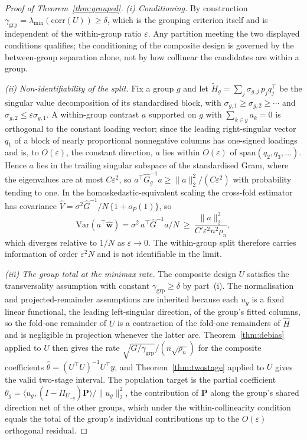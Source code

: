\documentclass[12pt]{article}
\newcommand{\1}{\mathbf{1}}
\newcommand{\Pmat}{\mathbf{P}}
\newcommand{\bw}{\mathbf{w}}
\begin{document}
\begin{proof}[Proof of Theorem~\ref{thm:grouped}]
\emph{(i) Conditioning.} By construction $\gamma_{\mathrm{grp}}=\lambda_{\min}(\mathrm{corr}(U))\ge\delta$,
which is the grouping criterion itself and is independent of the within-group ratio $\varepsilon$. Any
partition meeting the two displayed conditions qualifies; the conditioning of the composite design is governed
by the between-group separation alone, not by how collinear the candidates are within a group.

\emph{(ii) Non-identifiability of the split.} Fix a group $g$ and let $\widetilde H_g=\sum_j\sigma_{g,j}\,
p_j q_j^\top$ be the singular value decomposition of its standardised block, with $\sigma_{g,1}\ge\sigma_{g,2}
\ge\cdots$ and $\sigma_{g,2}\le\varepsilon\sigma_{g,1}$. A within-group contrast $a$ supported on $g$ with
$\sum_{k\in g}a_k=0$ is orthogonal to the constant loading vector; since the leading right-singular vector
$q_1$ of a block of nearly proportional nonnegative columns has one-signed loadings and is, to $O(\varepsilon)$,
the constant direction, $a$ lies within $O(\varepsilon)$ of $\mathrm{span}(q_2,q_3,\dots)$. Hence $a$ lies in
the trailing singular subspace of the standardised Gram, where the eigenvalues are at most $C\varepsilon^2$, so
$a^\top\widehat G_g^{-1}a\ge\|a\|_2^2/(C\varepsilon^2)$ with probability tending to one. In the
homoskedastic-equivalent scaling the cross-fold estimator has covariance $\widehat V=\sigma^2\widehat
G^{-1}/N\,\{1+o_P(1)\}$, so
\[
    \mathrm{Var}(a^\top\widehat{\bw})=\sigma^2\,a^\top\widehat G^{-1}a/N
    \ \ge\ \frac{\|a\|_2^2}{C'\varepsilon^2 n^2\rho_n},
\]
which diverges relative to $1/N$ as $\varepsilon\to0$. The within-group split therefore carries information of
order $\varepsilon^2 N$ and is not identifiable in the limit.

\emph{(iii) The group total at the minimax rate.} The composite design $U$ satisfies the transversality
assumption with constant $\gamma_{\mathrm{grp}}\ge\delta$ by part~(i). The normalisation and projected-remainder
assumptions are inherited because each $u_g$ is a fixed linear functional, the leading left-singular direction,
of the group's fitted columns, so the fold-one remainder of $U$ is a contraction of the fold-one remainders of
$\widehat H$ and is negligible in projection whenever the latter are. Theorem~\ref{thm:debias} applied to $U$
then gives the rate $\sqrt{G/\gamma_{\mathrm{grp}}}/(n\sqrt{\rho_n})$ for the composite coefficients
$\widehat\theta=(U^\top U)^{-1}U^\top y$, and Theorem~\ref{thm:twostage} applied to $U$ gives the valid
two-stage interval. The population target is the partial coefficient $\theta_g=\langle u_g,(I-\Pi_{U_{-g}})
\Pmat\rangle/\|u_g\|_2^2$, the contribution of $\Pmat$ along the group's shared direction net of the other
groups, which under the within-collinearity condition equals the total of the group's individual contributions
up to the $O(\varepsilon)$ orthogonal residual.
\end{proof}
\end{document}
